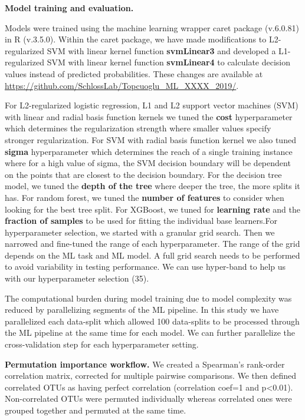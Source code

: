 \documentclass[11pt,]{article}
\begin{document}
\textbf{Model training and evaluation.}

Models were trained using the machine learning wrapper caret package
(v.6.0.81) in R (v.3.5.0). Within the caret package, we have made
modifications to L2-regularized SVM with linear kernel function
\textbf{svmLinear3} and developed a L1-regularized SVM with linear
kernel function \textbf{svmLinear4} to calculate decision values instead
of predicted probabilities. These changes are available at
\url{https://github.com/SchlossLab/Topcuoglu_ML_XXXX_2019/}.

For L2-regularized logistic regression, L1 and L2 support vector
machines (SVM) with linear and radial basis function kernels we tuned
the \textbf{cost} hyperparameter which determines the regularization
strength where smaller values specify stronger regularization. For SVM
with radial basis function kernel we also tuned \textbf{sigma}
hyperparameter which determines the reach of a single training instance
where for a high value of sigma, the SVM decision boundary will be
dependent on the points that are closest to the decision boundary. For
the decision tree model, we tuned the \textbf{depth of the tree} where
deeper the tree, the more splits it has. For random forest, we tuned the
\textbf{number of features} to consider when looking for the best tree
split. For XGBoost, we tuned for \textbf{learning rate} and the
\textbf{fraction of samples} to be used for fitting the individual base
learners.For hyperparameter selection, we started with a granular grid
search. Then we narrowed and fine-tuned the range of each
hyperparameter. The range of the grid depends on the ML task and ML
model. A full grid search needs to be performed to avoid variability in
testing performance. We can use hyper-band to help us with our
hyperparameter selection (35).

The computational burden during model training due to model complexity
was reduced by parallelizing segments of the ML pipeline. In this study
we have parallelized each data-split which allowed 100 data-splits to be
processed through the ML pipeline at the same time for each model. We
can further parallelize the cross-validation step for each
hyperparameter setting.

\textbf{Permutation importance workflow.} We created a Spearman's
rank-order correlation matrix, corrected for multiple pairwise
comparisons. We then defined correlated OTUs as having perfect
correlation (correlation coef=1 and p\textless{}0.01). Non-correlated
OTUs were permuted individually whereas correlated ones were grouped
together and permuted at the same time.
\end{document}
